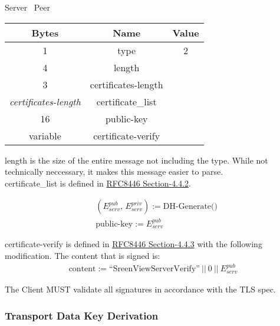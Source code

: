 \begin{center}
    Server \textrightarrow\ Peer\\
    \begin{tabular}{|c|c|c|}
        \hline
        \textbf{Bytes}             & \textbf{Name}       & \textbf{Value} \\
        \hline
        1                          & type                & 2              \\
        \hline
        4                          & length              &                \\
        \hline
        3                          & certificates-length &                \\
        \hline
        \emph{certificates-length} & certificate\_list   &                \\
        \hline
        16                         & public-key          &                \\
        \hline
        variable                   & certificate-verify  &                \\
        \hline
    \end{tabular}
\end{center}

length is the size of the entire message not including the type. While not technically neccessary, it makes this
message easier to parse.\\

certificate\_list is defined in \href{https://datatracker.ietf.org/doc/html/rfc8446#section-4.4.2}{RFC8446
Section-4.4.2}.

\begin{align*}
    & (E_{serv}^{pub},\, E_{serv}^{priv}) := \text{DH-Generate()}\\
    & \text{public-key} := E_{serv}^{pub}
\end{align*}

certificate-verify is defined in \href{https://datatracker.ietf.org/doc/html/rfc8446#section-4.4
.3}{RFC8446 Section-4.4.3} with the following modification. The content that is signed is:\\

\begin{align*}
    \text{content} := \text{``SreenViewServerVerify''}\ ||\ 0\ ||\ E_{serv}^{pub}
\end{align*}

The Client MUST validate all signatures in accordance with the TLS spec.

\subsubsection{Transport Data Key Derivation}

